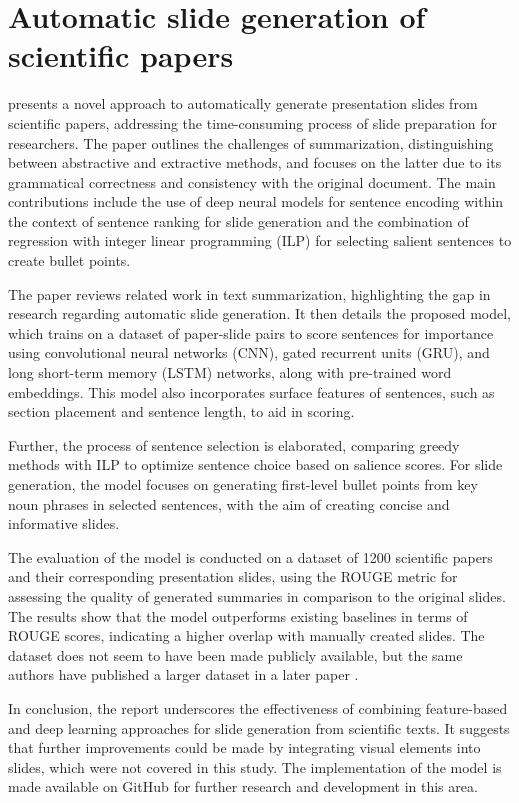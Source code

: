 \section{Automatic slide generation of scientific papers}

\citet{Sefid:2019:K-CAP} presents a novel approach to automatically generate presentation slides from scientific papers, addressing the time-consuming process of slide preparation for researchers. The paper outlines the challenges of summarization, distinguishing between abstractive and extractive methods, and focuses on the latter due to its grammatical correctness and consistency with the original document. The main contributions include the use of deep neural models for sentence encoding within the context of sentence ranking for slide generation and the combination of regression with integer linear programming (ILP) for selecting salient sentences to create bullet points.

The paper reviews related work in text summarization, highlighting the gap in research regarding automatic slide generation. It then details the proposed model, which trains on a dataset of paper-slide pairs to score sentences for importance using convolutional neural networks (CNN), gated recurrent units (GRU), and long short-term memory (LSTM) networks, along with pre-trained word embeddings. This model also incorporates surface features of sentences, such as section placement and sentence length, to aid in scoring.

Further, the process of sentence selection is elaborated, comparing greedy methods with ILP to optimize sentence choice based on salience scores. For slide generation, the model focuses on generating first-level bullet points from key noun phrases in selected sentences, with the aim of creating concise and informative slides.

The evaluation of the model is conducted on a dataset of 1200 scientific papers and their corresponding presentation slides, using the ROUGE metric for assessing the quality of generated summaries in comparison to the original slides. The results show that the model outperforms existing baselines in terms of ROUGE scores, indicating a higher overlap with manually created slides. The dataset does not seem to have been made publicly available, but the same authors have published a larger dataset in a later paper \citep{Sefid:2021:arXiv}.

In conclusion, the report underscores the effectiveness of combining feature-based and deep learning approaches for slide generation from scientific texts. It suggests that further improvements could be made by integrating visual elements into slides, which were not covered in this study. The implementation of the model is made available on GitHub for further research and development in this area.

